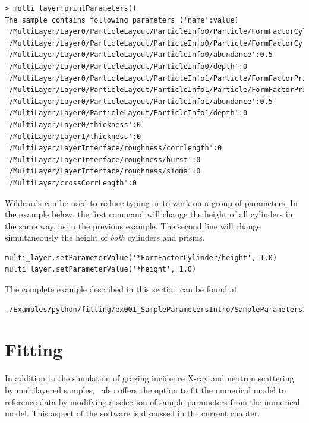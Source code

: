 \begin{lstlisting}[language=shell, style=commandline]
> multi_layer.printParameters()
The sample contains following parameters ('name':value)
'/MultiLayer/Layer0/ParticleLayout/ParticleInfo0/Particle/FormFactorCylinder/height':5
'/MultiLayer/Layer0/ParticleLayout/ParticleInfo0/Particle/FormFactorCylinder/radius':5
'/MultiLayer/Layer0/ParticleLayout/ParticleInfo0/abundance':0.5
'/MultiLayer/Layer0/ParticleLayout/ParticleInfo0/depth':0
'/MultiLayer/Layer0/ParticleLayout/ParticleInfo1/Particle/FormFactorPrism3/length':5
'/MultiLayer/Layer0/ParticleLayout/ParticleInfo1/Particle/FormFactorPrism3/height':5
'/MultiLayer/Layer0/ParticleLayout/ParticleInfo1/abundance':0.5
'/MultiLayer/Layer0/ParticleLayout/ParticleInfo1/depth':0
'/MultiLayer/Layer0/thickness':0
'/MultiLayer/Layer1/thickness':0
'/MultiLayer/LayerInterface/roughness/corrlength':0
'/MultiLayer/LayerInterface/roughness/hurst':0
'/MultiLayer/LayerInterface/roughness/sigma':0
'/MultiLayer/crossCorrLength':0
\end{lstlisting}

Wildcards  can be used to reduce typing or to work on a group
of parameters. In the example below, the first command will change the
height of all cylinders in the same way, as in the previous example. The second line will change simultaneously the height of {\it both} cylinders and prisms.
\begin{lstlisting}[language=shell, style=commandline]
multi_layer.setParameterValue('*FormFactorCylinder/height', 1.0)
multi_layer.setParameterValue('*height', 1.0)
\end{lstlisting}

The complete example described in this section can be found at 
\begin{lstlisting}[language=shell, style=commandline]
./Examples/python/fitting/ex001_SampleParametersIntro/SampleParametersIntro.py
\end{lstlisting}

\section{Fitting} 

In addition to the simulation of grazing incidence
X-ray and neutron scattering by
multilayered samples, \BornAgain\ also offers the option to
fit the numerical model to reference data by modifying a selection of
sample parameters from the numerical model.  This aspect
of the software is discussed in the current chapter.

